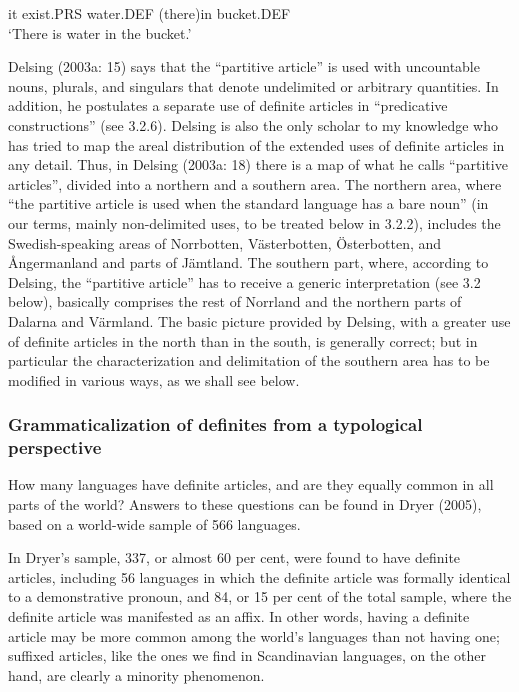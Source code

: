it  exist.PRS  water.DEF  (there)in  bucket.DEF\\ %


‘There is water in the bucket.’
\z


Delsing (2003a: 15) says that the “partitive article” is used with uncountable nouns, plurals, and singulars that denote undelimited or arbitrary quantities. In addition, he postulates a separate use of definite articles in “predicative constructions” (see 3.2.6). Delsing is also the only scholar to my knowledge who has tried to map the areal distribution of the extended uses of definite articles in any detail. Thus, in Delsing (2003a: 18) there is a map of what he calls “partitive articles”, divided into a northern and a southern area. The northern area, where “the partitive article is used when the standard language has a bare noun” (in our terms, mainly non-delimited uses, to be treated below in 3.2.2), includes the Swedish-speaking areas of Norrbotten, Västerbotten, Österbotten, and Ångermanland and parts of Jämtland. The southern part, where, according to Delsing, the “partitive article” has to receive a generic interpretation (see 3.2 below), basically comprises the rest of Norrland and the northern parts of Dalarna and Värmland. The basic picture provided by Delsing, with a greater use of definite articles in the north than in the south, is generally correct; but in particular the characterization and delimitation of the southern area has to be modified in various ways, as we shall see below. 

\subsubsection[Grammaticalization of definites from a typological perspective]{\rmfamily Grammaticalization of definites from a typological perspective}
\label{bkm:Ref218335964}\label{bkm:Ref218335969}%
How many languages have  definite articles, and are they equally common in all parts of the world? Answers to these questions can be found in Dryer (2005), based on a world-wide sample of 566 languages. 

In Dryer’s sample, 337, or almost 60 per cent, were found to have definite articles, including 56 languages in which the definite article was formally identical to a demonstrative pronoun, and 84, or 15 per cent of the total sample, where the definite article was manifested as an affix. In other words, having a definite article may be more common among the world’s languages than not having one; suffixed articles, like the ones we find in Scandinavian languages, on the other hand, are clearly a minority phenomenon. 

